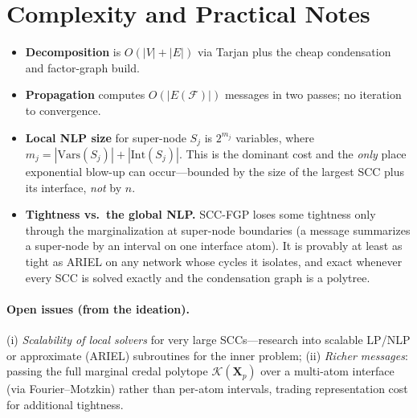 \documentclass[11pt]{article}
\newcommand{\cK}{\mathcal{K}}
\newcommand{\cF}{\mathcal{F}}
\newcommand{\Vars}{\mathrm{Vars}}
\newcommand{\Iface}{\mathrm{Int}}      %
\begin{document}
\section{Complexity and Practical Notes}\label{sec:complexity}

\begin{itemize}
  \item \textbf{Decomposition} is $O(|V|+|E|)$ via Tarjan plus the cheap
        condensation and factor-graph build.
  \item \textbf{Propagation} computes $O(|E(\cF)|)$ messages in two passes;
        no iteration to convergence.
  \item \textbf{Local NLP size} for super-node $S_j$ is $2^{m_j}$ variables,
        where $m_j=|\Vars(S_j)|+|\Iface(S_j)|$. This is the dominant cost and
        the \emph{only} place exponential blow-up can occur---bounded by the
        size of the largest SCC plus its interface, \emph{not} by $n$.
  \item \textbf{Tightness vs.\ the global NLP.} SCC-FGP loses some tightness
        only through the marginalization at super-node boundaries (a message
        summarizes a super-node by an interval on one interface atom). It is
        provably at least as tight as ARIEL on any network whose cycles it
        isolates, and exact whenever every SCC is solved exactly and the
        condensation graph is a polytree.
\end{itemize}

\paragraph{Open issues (from the ideation).}
(i) \emph{Scalability of local solvers} for very large SCCs---research into
scalable LP/NLP or approximate (ARIEL) subroutines for the inner problem;
(ii) \emph{Richer messages}: passing the full marginal credal polytope
$\cK(\mathbf{X}_p)$ over a multi-atom interface (via Fourier--Motzkin) rather
than per-atom intervals, trading representation cost for additional tightness.

\end{document}
